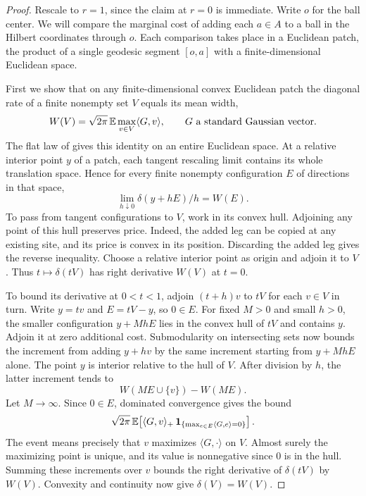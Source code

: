 \begin{proof}
Rescale to $r=1$, since the claim at $r=0$ is immediate. Write $o$
for the ball center. We will compare the marginal cost of adding
each $a\in A$ to a ball in the Hilbert coordinates through $o$. Each
comparison takes place in a Euclidean patch, the product of a single
geodesic segment $[o,a]$ with a finite-dimensional Euclidean space.

First we show that on any finite-dimensional convex Euclidean patch
the diagonal rate of a finite nonempty set $V$ equals its mean width,
\[
 W(V)=\sqrt{2\pi}\,\mathbb E\max_{v\in V}\langle G,v\rangle,\qquad
 G\ \text{a standard Gaussian vector}.
\]
The flat law of \cite[Theorem~]{oaG} gives this
identity on an entire Euclidean space. At a relative interior point
$y$ of a patch, each tangent rescaling limit contains its whole
translation space. Hence for every finite nonempty configuration $E$
of directions in that space,
\[
          \lim_{h\downarrow0}\delta(y+hE)/h=W(E).
\]
To pass from tangent configurations to $V$, work in its convex hull.
Adjoining any point of this hull preserves price. Indeed, the added
leg can be copied at any existing site, and its price is convex
in its position. Discarding the added leg gives the reverse inequality.
Choose a relative interior point as origin and
adjoin it to $V$. Thus $t\mapsto\delta(tV)$ has right derivative
$W(V)$ at $t=0$.

To bound its derivative at $0<t<1$, adjoin $(t+h)v$ to $tV$ for
each $v\in V$ in turn. Write $y=tv$ and $E=tV-y$, so $0\in E$.
For fixed $M>0$ and small $h>0$, the smaller configuration
$y+MhE$ lies in the convex hull of $tV$ and contains $y$. Adjoin
it at zero additional cost. Submodularity on intersecting sets
\cite[Proposition~]{oaG} now bounds the increment
from adding $y+hv$ by the same increment starting from $y+MhE$
alone. The point $y$ is interior relative to the hull of $V$. After
division by $h$, the latter increment tends to
\[
             W(ME\cup\{v\})-W(ME).
\]
Let $M\to\infty$. Since $0\in E$, dominated convergence gives the bound
\[
 \sqrt{2\pi}\,\mathbb E\!\left[
   \langle G,v\rangle_+\,
   \mathbf1_{\{\max_{e\in E}\langle G,e\rangle=0\}}\right].
\]
The event means precisely that $v$ maximizes $\langle G,\cdot\rangle$
on $V$. Almost surely the maximizing point is unique, and its value
is nonnegative since $0$ is in the hull. Summing these increments over
$v$ bounds the right derivative of $\delta(tV)$ by $W(V)$.
Convexity and continuity now give $\delta(V)=W(V)$.


\end{proof}
